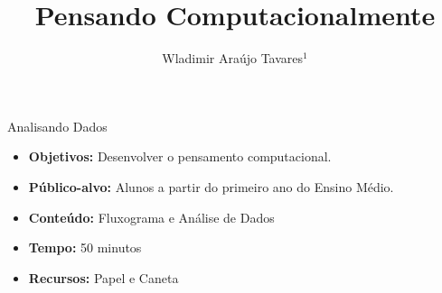 \documentclass{beamer}
\title {Pensando Computacionalmente}
\author[Wladimir Araújo Tavares]{ Wladimir Araújo Tavares$^{1}$  }
\institute[UFC]{$^{1}$Universidade Federal do Ceará - Campus de Quixadá\\}
\date{}
\begin{document}
\begin{frame}
	\titlepage
\end{frame}




\begin{frame}{Analisando Dados}

\begin{itemize}
\item \textbf{Objetivos:} Desenvolver o pensamento computacional.

\item \textbf{Público-alvo:}  Alunos a partir do primeiro ano do Ensino Médio.

\item \textbf{Conteúdo:} Fluxograma e Análise de Dados

\item \textbf{Tempo:} 50 minutos

\item \textbf{Recursos:} Papel e Caneta

\end{itemize}
    
\end{frame}


\end{document}
